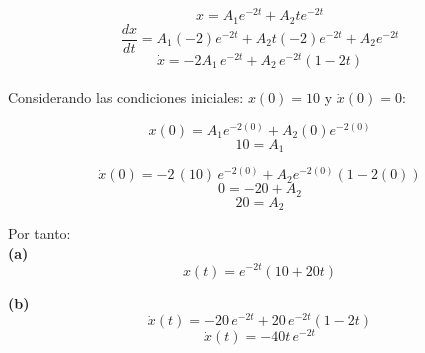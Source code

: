 \documentclass[letter,11pt]{article}
\begin{document}
\begin{equation*}
    x = A_1 e^{-2t} + A_2 t e^{-2t}
\end{equation*}
\begin{equation*}
    \frac{dx}{dt} = A_1 (-2) e^{-2t} + A_2 t (-2) e^{-2t} + A_2 e^{-2t}
\end{equation*}
\begin{equation}
    \dot{x} = - 2 A_1\, e^{-2t} + A_2\, e^{-2t} (1-2t)
\end{equation}
\\

Considerando las condiciones iniciales: $x(0) = 10$ y $\dot{x}(0) = 0$:

\begin{equation*}
    x(0) = A_1 e^{-2(0)} + A_2 (0) e^{-2(0)}
\end{equation*}
\begin{equation*}
    10 = A_1
\end{equation*}

\begin{equation*}
    \dot{x}(0) = - 2\, (10)\, e^{-2 (0)} + A_2 e^{-2 (0)} (1 - 2 (0))
\end{equation*}
\begin{equation*}
    0 = -20 + A_2
\end{equation*}
\begin{equation*}
    20 = A_2
\end{equation*}

Por tanto:
\\

\textbf{(a)} \\

\begin{equation}
    x(t) = e^{-2t} (10 + 20 t)
\end{equation}

\textbf{(b)} \\

\begin{equation*}
    \dot{x}(t) = -20\, e^{-2t} + 20\, e^{-2t} (1-2t)
\end{equation*}
\begin{equation}
    \dot{x}(t) = -40t\, e^{-2t}
\end{equation}
\end{document}
